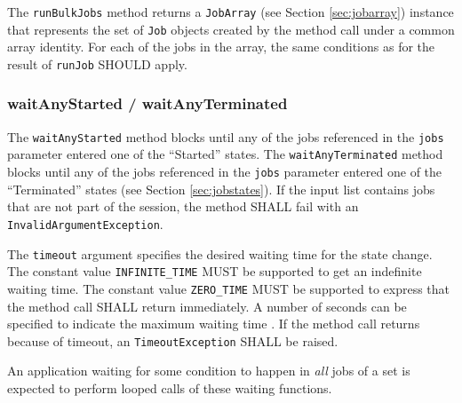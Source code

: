\documentclass{article}
\newcommand{\h}[1]{\lstinline|#1|}
\newcommand{\rat}[1]{}
\begin{document}
The \h{runBulkJobs} method returns a \h{JobArray} (see Section \ref{sec:jobarray}) instance that represents the set of \h{Job} objects created by the method call under a common array identity. For each of the jobs in the array, the same conditions as for the result of \h{runJob} SHOULD apply. 

\rat{
There was a discussion (mailing list Jan 2011) about having specialized job templates for bulk submission, with support for the start / end index and a slots limit. We rejected that, since job templates are intended for re-usage. 

The May 4th 2011 conf call identified Grid Engine, Torque and LSF as the only systems having support for maxParallel. The feature was determined as critical enough for still adding it, therefore the ignorance rule and the MAY semantics are applied.
}

\subsubsection{waitAnyStarted / waitAnyTerminated}
\label{sec:waitanystarted}

The \h{waitAnyStarted} method blocks until any of the jobs referenced in the \h{jobs} parameter entered one of the \enquote{Started} states. The \h{waitAnyTerminated} method blocks until any of the jobs referenced in the \h{jobs} parameter entered one of the \enquote{Terminated} states (see Section \ref{sec:jobstates}). If the input list contains jobs that are not part of the session, the method SHALL fail with an \h{InvalidArgumentException}. 

The \h{timeout} argument specifies the desired waiting time for the state change. The constant value \h{INFINITE_TIME} MUST be supported to get an indefinite waiting time. The constant value \h{ZERO_TIME} MUST be supported to express that the method call SHALL return immediately. A number of seconds can be specified to indicate the maximum waiting time . If the method call returns because of timeout, an \h{TimeoutException} SHALL be raised. 

An application waiting for some condition to happen in \emph{all} jobs of a set is expected to perform looped calls of these waiting functions. 

\rat{
People typically ask for the waitAll..() counterparts of these functions. Since they are so easy to implement in the application itself, we could not see any benefit in adding them. Due to their intended long-blocking operation, the DRM system would no be able to offer any better (meaning much faster) implementation to be wrapped by DRMAA.

A section on synchronization of multi-threaded parallel wait calls was removed. This would complicate DRMAA implementations, since synchronization does not map to the obvious state polling approach. An optimization like this would be classically a task of application-oriented APIs - so, Andre has to solve it.
}
\end{document}

